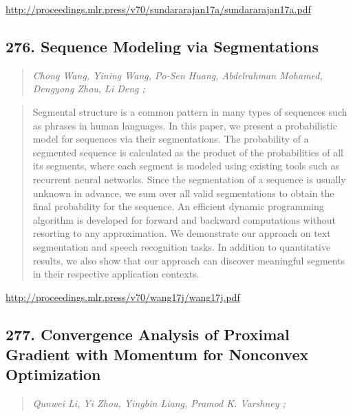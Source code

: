 \documentclass{article}
\begin{document}
\href{http://proceedings.mlr.press/v70/sundararajan17a/sundararajan17a.pdf}{http://proceedings.mlr.press/v70/sundararajan17a/sundararajan17a.pdf}

\subsection{276. Sequence Modeling via Segmentations}

\begin{quote}
\footnotesize{\textit{Chong Wang, Yining Wang, Po-Sen Huang, Abdelrahman Mohamed, Dengyong Zhou, Li Deng ;}}
\end{quote}

\begin{quote}
    Segmental structure is a common pattern in many types of sequences such as phrases in human languages. In this paper, we present a probabilistic model for sequences via their segmentations. The probability of a segmented sequence is calculated as the product of the probabilities of all its segments, where each segment is modeled using existing tools such as recurrent neural networks. Since the segmentation of a sequence is usually unknown in advance, we sum over all valid segmentations to obtain the final probability for the sequence. An efficient dynamic programming algorithm is developed for forward and backward computations without resorting to any approximation. We demonstrate our approach on text segmentation and speech recognition tasks. In addition to quantitative results, we also show that our approach can discover meaningful segments in their respective application contexts.  \end{quote}

\href{http://proceedings.mlr.press/v70/wang17j/wang17j.pdf}{http://proceedings.mlr.press/v70/wang17j/wang17j.pdf}

\subsection{277. Convergence Analysis of Proximal Gradient with Momentum for Nonconvex Optimization}

\begin{quote}
\footnotesize{\textit{Qunwei Li, Yi Zhou, Yingbin Liang, Pramod K. Varshney ;}}
\end{quote}
\end{document}
